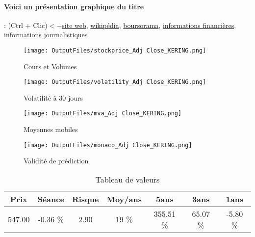 \documentclass[11pt,a4paper]{report}%
\begin{document}
\paragraph{Voici un présentation graphique du titre} : (Ctrl + Clic)$<-$\href{https://www.kering.com/fr/finance/}{site web}, \href{https://fr.wikipedia.org/wiki/Kering}{wikipédia}, \href{https://www.boursorama.com/cours/1rPKER}{boursorama}, \href{https://www.qwant.com/?q=site:https:%2f%2fwww.easybourse.com%2faction-societe%2fKERING&t=web&client=ext-firefox-hp}{informations financières}, \href{https://bourse.lerevenu.com/cours-de-bourse/fiche-valeur-synthese/KERING/KER-FR}{informations journalistiques}
\begin{figure}[!htb]
   \begin{minipage}{0.5\textwidth}
     \centering
     \texttt{[image: OutputFiles/stockprice\_Adj Close\_KERING.png]}
     \caption{Cours et Volumes}\label{Fig:price_KERING}
   \end{minipage}\hfill
   \begin{minipage}{0.5\textwidth}
     \centering
     \texttt{[image: OutputFiles/volatility\_Adj Close\_KERING.png]}
     \caption{Volatilité à 30 jours}\label{Fig:volat_KERING}
   \end{minipage}
\end{figure}
\begin{figure}[!htb]
   \begin{minipage}{0.5\textwidth}
     \centering
     \texttt{[image: OutputFiles/mva\_Adj Close\_KERING.png]}
     \caption{Moyennes mobiles}\label{Fig:mva_KERING}
   \end{minipage}\hfill
   \begin{minipage}{0.5\textwidth}
     \centering
     \texttt{[image: OutputFiles/monaco\_Adj Close\_KERING.png]}
     \caption{Validité de prédiction}\label{Fig:prediction_KERING}
   \end{minipage}
\end{figure}

\begin{table}[H]
  \centering
    \begin{tabular}{|c|c|c|c|c|c|c|}
    \hline
    Prix & Séance & Risque  & Moy/ans & 5ans & 3ans & 1ans \\
    \hline
    547.00 &    -0.36 \%    & 2.90 & 19 \% & 355.51 \% & 65.07 \% & -5.80 \% \\
    \hline
    \end{tabular}%
        \label{tab:table_KERING}%
      \caption{Tableau de valeurs}
\end{table}%
\end{document}
